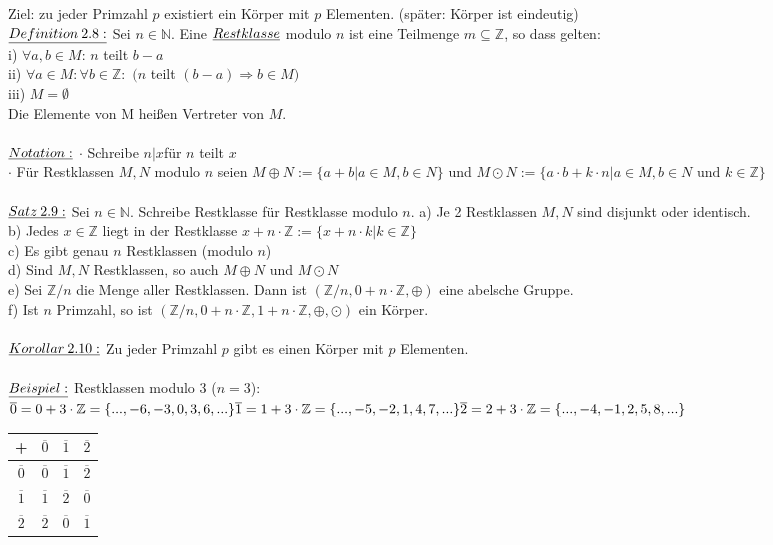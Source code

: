 \documentclass[fleqn, a4paper, 11pt]{article}
\begin{document}
Ziel: zu jeder Primzahl $p$ existiert ein K\"orper mit $p$ Elementen. (sp\"ater: K\"orper ist eindeutig)\\
$\uline{Definition\:2.8:}$ Sei $n\in\mathbb{N}$. Eine $\uline{Restklasse}$ modulo $n$ ist eine Teilmenge $m\subseteq\mathbb{Z}$, so dass gelten:\\
i) $\forall a,b\in M$: $n$ teilt $b-a$\\
ii) $\forall a\in M:\forall b\in\mathbb{Z}:$ $(n$ teilt $(b-a)\Rightarrow b\in M)$\\
iii) $M=\emptyset$\\
Die Elemente von M hei\ss{}en Vertreter von $M$.\\
\\
$\uline{Notation:}$ $\cdot$ Schreibe \dq$n|x$\dq f\"ur \dq$n$ teilt $x$\dq\\
$\cdot$ F\"ur Restklassen $M,N$ modulo $n$ seien $M\oplus N:=\{a+b|a\in M,b\in N\}$ und $M\odot N:=\{a\cdot b+k\cdot n|a\in M,b\in N\text{ und }k\in\mathbb{Z}\}$\\
\\
$\uline{Satz\:2.9:}$ Sei $n\in\mathbb{N}$. Schreibe \dq Restklasse \dq f\"ur \dq Restklasse modulo $n$\dq. a) Je 2 Restklassen $M,N$ sind disjunkt oder identisch.\\
b) Jedes $x\in\mathbb{Z}$ liegt in der Restklasse $x+n\cdot\mathbb{Z}:=\{x+n\cdot k|k\in\mathbb{Z}\}$\\
c) Es gibt genau $n$ Restklassen (modulo $n$)\\
d) Sind $M,N$ Restklassen, so auch $M\oplus N$ und $M\odot N$\\
e) Sei $\mathbb{Z}/n$ die Menge aller Restklassen. Dann ist $(\mathbb{Z}/n,0+n\cdot\mathbb{Z},\oplus)$ eine abelsche Gruppe.\\
f) Ist $n$ Primzahl, so ist $(\mathbb{Z}/n,0+n\cdot\mathbb{Z},1+n\cdot\mathbb{Z},\oplus,\odot)$ ein K\"orper.\\
\\
$\uline{Korollar\:2.10:}$ Zu jeder Primzahl $p$ gibt es einen K\"orper mit $p$ Elementen.\\
\\
$\uline{Beispiel:}$ Restklassen modulo 3 ($n=3$):\\
$\overline{0}=0+3\cdot\mathbb{Z}=\{...,-6,-3,0,3,6,...\}\\
\overline{1}=1+3\cdot\mathbb{Z}=\{...,-5,-2,1,4,7,...\}\\
\overline{2}=2+3\cdot\mathbb{Z}=\{...,-4,-1,2,5,8,...\}$\\
\begin{tabular}{|c|ccc|}
	\hline
	+&$\overline{0}$&$\overline{1}$&$\overline{2}$\\
	\hline
	$\overline{0}$ & $\overline{0}$ &$ \overline{1}$ & $\overline{2}$\\
	$\overline{1}$ &$ \overline{1}$ & $\overline{2}$ & $\overline{0}$\\
	$\overline{2}$ &$ \overline{2}$ & $\overline{0}$ & $\overline{1}$\\
	\hline
\end{tabular}\\
\end{document}
